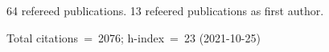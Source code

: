64 refereed publications. 13 refeered publications as first author.

Total citations~=~2076; h-index~=~23 (2021-10-25)